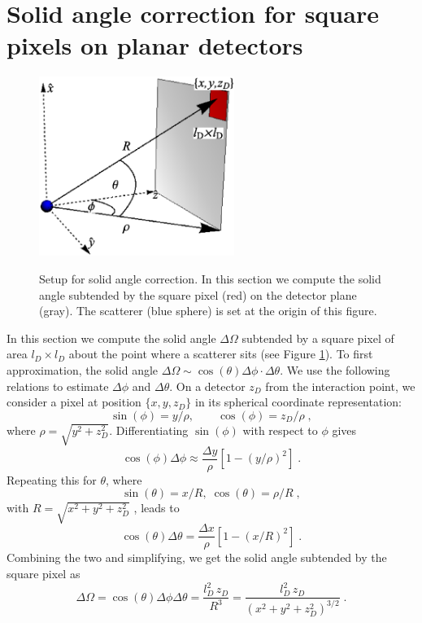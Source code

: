 \documentclass[]{iucr}              %
\begin{document}
\section{Solid angle correction for square pixels on planar detectors}\label{sec:solidAngle}
\begin{figure}
\caption{Setup for solid angle correction. In this section we compute the solid angle subtended by the square pixel (red) on the detector plane (gray). The scatterer (blue sphere) is set at the origin of this figure.}
\includegraphics[width=2.5in]{figures/solidAngle.eps} \label{fig:solidAngle}
\end{figure}


In this section we compute the solid angle $\Delta \Omega$ subtended by a square pixel of area $l_D \times l_D$ about the point where a scatterer sits (see Figure \ref{fig:solidAngle}). To first approximation, the solid angle $\Delta \Omega \sim \cos(\theta) \Delta \phi \cdot \Delta \theta$. We use the following relations to estimate  $\Delta \phi$ and $\Delta \theta$. On a detector $z_D$ from the interaction point, we consider a pixel at position $\{x,y,z_D\}$ in its spherical coordinate representation:
\begin{equation}
\sin (\phi) = y /\rho , \qquad \cos(\phi) = z_D / \rho \;,  
\end{equation}
where $\rho = \sqrt{y^2 + z_D^2}$.
Differentiating $\sin(\phi)$ with respect to $\phi$ gives
\begin{equation}
\cos(\phi) \Delta \phi \approx \frac{\Delta y}{\rho} \left[1 - \left( y/\rho\right)^2 \right]\;.
\end{equation}
Repeating this for $\theta$, where
\begin{equation}
\sin (\theta) = x /R ,\;  \cos(\theta) = \rho / R \;,
\end{equation}
with $R = \sqrt{x^2 + y^2 + z_D^2}$ , leads to 
\begin{equation}
\cos(\theta)\Delta \theta = \frac{\Delta x}{\rho} \left[ 1 - \left(x/R\right)^2\right] \;.
\end{equation}
Combining the two and simplifying, we get the solid angle subtended by the square pixel as
\begin{equation}
\Delta \Omega = \cos(\theta) \Delta \phi \Delta \theta = \frac{l_D^2\, z_D}{R^3} =  \frac{l_D^2\, z_D}{\left( x^2 + y^2 + z_D^2\right)^{3/2}} \; .
\end{equation}
\end{document}

